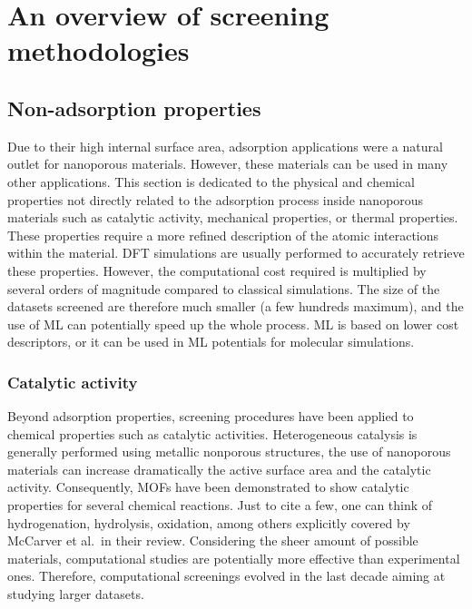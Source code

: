 \documentclass[main.tex]{subfiles}
\begin{document}
\section{An overview of screening methodologies}


\subsection{Non-adsorption properties}

Due to their high internal surface area, adsorption applications were a natural outlet for nanoporous materials. However, these materials can be used in many other applications. This section is dedicated to the physical and chemical properties not directly related to the adsorption process inside nanoporous materials such as catalytic activity,\cite{Singh_2015, Greeley_2006, Back_2020}
mechanical properties,\cite{Chibani_2019, Gaillac_2020}
or thermal properties.\cite{Toher_2014, Sarikurt_2020, Ducamp_2021} These properties require a more refined description of the atomic interactions within the material. DFT simulations are usually performed to accurately retrieve these properties. However, the computational cost required is multiplied by several orders of magnitude compared to classical simulations. The size of the datasets screened are therefore much smaller (a few hundreds maximum), and the use of ML can potentially speed up the whole process. ML is based on lower cost descriptors,\cite{Evans_2017, Ducamp_2022} or it can be used in ML potentials for molecular simulations\cite{Eckhoff_2019,Friederich_2021}.

\subsubsection{Catalytic activity}

Beyond adsorption properties, screening procedures have been applied to chemical properties such as catalytic activities. Heterogeneous catalysis is generally performed using metallic nonporous structures, the use of nanoporous materials can increase dramatically the active surface area and the catalytic activity. Consequently, MOFs have been demonstrated to show catalytic properties for several chemical reactions. Just to cite a few, one can think of hydrogenation, hydrolysis, oxidation, among others explicitly covered by McCarver et al.\ in their review.\cite{McCarver_2021}
Considering the sheer amount of possible materials, computational studies are potentially more effective than experimental ones. Therefore, computational screenings evolved in the last decade aiming at studying larger datasets.
\end{document}
